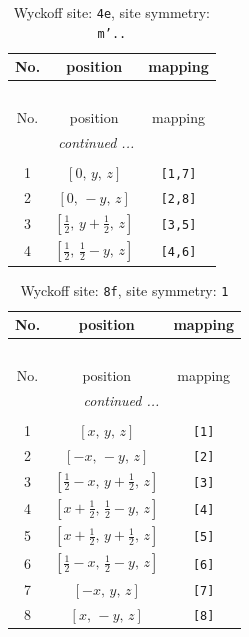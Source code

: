 \documentclass[fleqn,8pt]{jsarticle}
\begin{document}
\renewcommand{\arraystretch}{1.2}
\begin{longtable}{ccc}
\caption{Wyckoff site: {\tt 4e}, site symmetry: {\tt m'..}}
 \\
 \hline \hline
No. & position & mapping \\ \hline \endfirsthead

\multicolumn{2}{l}{\tablename\ \thetable{}} \\
 \hline \hline
No. & position & mapping \\ \hline \endhead

 \hline \hline
\multicolumn{2}{r}{\footnotesize\it continued ...} \\ \endfoot

 \hline \hline
\multicolumn{2}{r}{} \\ \endlastfoot

1 & $\left[ 0,\, y,\, z \right]$ & {\tt [1,7]} \\ \hline
2 & $\left[ 0,\, - y,\, z \right]$ & {\tt [2,8]} \\ \hline
3 & $\left[ \frac{1}{2},\, y + \frac{1}{2},\, z \right]$ & {\tt [3,5]} \\ \hline
4 & $\left[ \frac{1}{2},\, \frac{1}{2} - y,\, z \right]$ & {\tt [4,6]} \\
\end{longtable}
\renewcommand{\arraystretch}{1.2}
\begin{longtable}{ccc}
\caption{Wyckoff site: {\tt 8f}, site symmetry: {\tt 1}}
 \\
 \hline \hline
No. & position & mapping \\ \hline \endfirsthead

\multicolumn{2}{l}{\tablename\ \thetable{}} \\
 \hline \hline
No. & position & mapping \\ \hline \endhead

 \hline \hline
\multicolumn{2}{r}{\footnotesize\it continued ...} \\ \endfoot

 \hline \hline
\multicolumn{2}{r}{} \\ \endlastfoot

1 & $\left[ x,\, y,\, z \right]$ & {\tt [1]} \\ \hline
2 & $\left[ - x,\, - y,\, z \right]$ & {\tt [2]} \\ \hline
3 & $\left[ \frac{1}{2} - x,\, y + \frac{1}{2},\, z \right]$ & {\tt [3]} \\ \hline
4 & $\left[ x + \frac{1}{2},\, \frac{1}{2} - y,\, z \right]$ & {\tt [4]} \\ \hline
5 & $\left[ x + \frac{1}{2},\, y + \frac{1}{2},\, z \right]$ & {\tt [5]} \\ \hline
6 & $\left[ \frac{1}{2} - x,\, \frac{1}{2} - y,\, z \right]$ & {\tt [6]} \\ \hline
7 & $\left[ - x,\, y,\, z \right]$ & {\tt [7]} \\ \hline
8 & $\left[ x,\, - y,\, z \right]$ & {\tt [8]} \\
\end{longtable}
\end{document}
